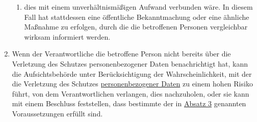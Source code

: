 \begin{enumerate}
\begin{enumerate}
    \item dies mit einem unverhältnismäßigen Aufwand verbunden wäre. In diesem Fall hat stattdessen eine öffentliche
     Bekanntmachung oder eine ähnliche Maßnahme zu erfolgen, durch die die betroffenen Personen vergleichbar wirksam
     informiert werden.
    \label{itm:34-3c}

  \end{enumerate}

  \item Wenn der Verantwortliche die betroffene Person nicht bereits über die Verletzung des Schutzes personenbezogener
   Daten benachrichtigt hat, kann die Aufsichtsbehörde unter Berücksichtigung der Wahrscheinlichkeit, mit der die
   Verletzung des Schutzes \hyperref[itm:04-1]{personenbezogener Daten} zu einem hohen Risiko führt, von dem Verantwortlichen verlangen,
   dies nachzuholen, oder sie kann mit einem Beschluss feststellen, dass bestimmte der in \hyperref[itm:34-3]{Absatz 3}
   genannten Voraussetzungen erfüllt sind.
  \label{itm:34-4}

\end{enumerate}


